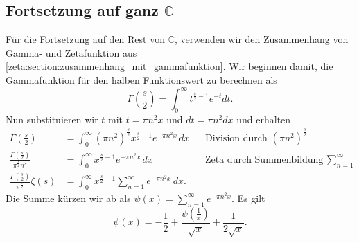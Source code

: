 \subsection{Fortsetzung auf ganz $\mathbb{C}$} \label{zeta:subsection:auf_ganz}
Für die Fortsetzung auf den Rest von $\mathbb{C}$, verwenden wir den Zusammenhang von Gamma- und Zetafunktion aus \ref{zeta:section:zusammenhang_mit_gammafunktion}.
Wir beginnen damit, die Gammafunktion für den halben Funktionswert zu berechnen als
\begin{equation}
    \Gamma \left( \frac{s}{2} \right)
    =
    \int_0^{\infty} t^{\frac{s}{2}-1} e^{-t} dt.
\end{equation}
Nun substituieren wir $t$ mit $t = \pi n^2 x$ und $dt=\pi n^2 dx$ und erhalten
\begin{align}
    \Gamma \left( \frac{s}{2} \right)
    &=
    \int_0^{\infty}
    (\pi n^2)^{\frac{s}{2}}
    x^{\frac{s}{2}-1}
    e^{-\pi n^2 x}
    \,dx
    && \text{Division durch } (\pi n^2)^{\frac{s}{2}}
    \\
    \frac{\Gamma \left( \frac{s}{2} \right)}{\pi^{\frac{s}{2}} n^s}
    &=
    \int_0^{\infty}
    x^{\frac{s}{2}-1}
    e^{-\pi n^2 x}
    \,dx
    && \text{Zeta durch Summenbildung } \sum_{n=1}^{\infty}
    \\
    \frac{\Gamma \left( \frac{s}{2} \right)}{\pi^{\frac{s}{2}}}
    \zeta(s)
    &=
    \int_0^{\infty}
    x^{\frac{s}{2}-1}
    \sum_{n=1}^{\infty}
    e^{-\pi n^2 x}
    \,dx. \label{zeta:equation:integral1}
\end{align}
Die Summe kürzen wir ab als $\psi(x) = \sum_{n=1}^{\infty} e^{-\pi n^2 x}$.
Es gilt
\begin{equation}\label{zeta:equation:psi}
    \psi(x)
    =
    - \frac{1}{2}
    + \frac{\psi\left(\frac{1}{x} \right)}{\sqrt{x}}
    + \frac{1}{2 \sqrt{x}}.
\end{equation}

